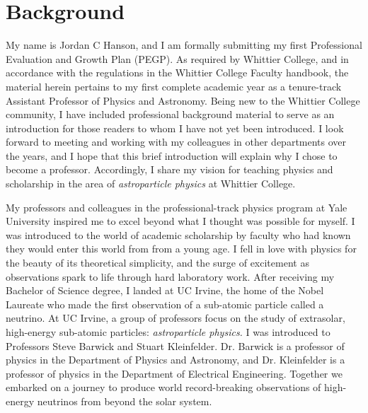 \documentclass[../../main.tex]{subfiles}
\begin{document}
\section{Background}

My name is Jordan C Hanson, and I am formally submitting my first Professional Evaluation and Growth Plan (PEGP).  As required by Whittier College, and in accordance with the regulations in the Whittier College Faculty handbook, the material herein pertains to my first complete academic year as a tenure-track Assistant Professor of Physics and Astronomy.  Being new to the Whittier College community, I have included professional background material to serve as an introduction for those readers to whom I have not yet been introduced.  I look forward to meeting and working with my colleagues in other departments over the years, and I hope that this brief introduction will explain why I chose to become a professor.  Accordingly, I share my vision for teaching physics and scholarship in the area of \textit{astroparticle physics} at Whittier College. \\ \hspace{0.1cm}

My professors and colleagues in the professional-track physics program at Yale University inspired me to excel beyond what I thought was possible for myself.  I was introduced to the world of academic scholarship by faculty who had known they would enter this world from from a young age.  I fell in love with physics for the beauty of its theoretical simplicity, and the surge of excitement as observations spark to life through hard laboratory work.  After receiving my Bachelor of Science degree, I landed at UC Irvine, the home of the Nobel Laureate who made the first observation of a sub-atomic particle called a neutrino.  At UC Irvine, a group of professors focus on the study of extrasolar, high-energy sub-atomic particles: \textit{astroparticle physics.}  I was introduced to Professors Steve Barwick and Stuart Kleinfelder.  Dr. Barwick is a professor of physics in the Department of Physics and Astronomy, and Dr. Kleinfelder is a professor of physics in the Department of Electrical Engineering.  Together we embarked on a journey to produce world record-breaking observations of high-energy neutrinos from beyond the solar system. \\ \hspace{0.1cm}
\end{document}
